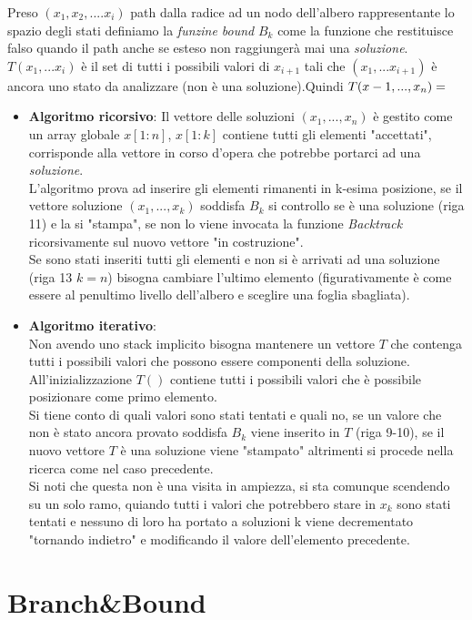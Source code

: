 \documentclass[a4paper]{article}
\begin{document}
Preso $(x_1,x_2,....x_i)$ path dalla radice ad un nodo dell'albero rappresentante lo spazio degli stati definiamo la \textit{funzine bound} $B_k$ come la funzione che restituisce falso quando il path anche se esteso non raggiungerà mai una \textit{soluzione}.\\
$T(x_1,...x_i)$ è il set di tutti i possibili valori di $x_{i+1}$ tali che $(x_1,...x_{i+1})$ è ancora uno stato da analizzare (non è una soluzione).Quindi $T(x-1,...,x_n) = \empty$
\begin{itemize}
	\item \textbf{Algoritmo ricorsivo}:
		Il vettore delle soluzioni $(x_1, ... , x_n)$ è gestito come un array globale $x[1:n]$, $x[1:k]$ contiene tutti gli elementi "accettati", corrisponde alla vettore in corso d'opera che potrebbe portarci ad una \textit{soluzione}.\\
		L'algoritmo prova ad inserire gli elementi rimanenti in k-esima posizione, se il vettore soluzione $(x_1,...,x_k)$ soddisfa $B_k$ si controllo se è una soluzione (riga 11) e la si "stampa", se non lo viene invocata la funzione \textit{Backtrack} ricorsivamente sul nuovo vettore "in costruzione".\\
		Se sono stati inseriti tutti gli elementi e non si è arrivati ad una soluzione (riga 13 $k=n$) bisogna cambiare l'ultimo elemento (figurativamente è come essere al penultimo livello dell'albero e sceglire una foglia sbagliata).
	\item \textbf{Algoritmo iterativo}:\\
		Non avendo uno stack implicito bisogna mantenere un vettore $T$ che contenga tutti i possibili valori che possono essere componenti della soluzione.
		All'inizializzazione $T()$ contiene tutti i possibili valori che è possibile posizionare come primo elemento.\\
		Si tiene conto di quali valori sono stati tentati e quali no, se un valore che non è stato ancora provato soddisfa $B_k$ viene inserito in $T$ (riga 9-10), se il nuovo vettore $T$ è una soluzione viene "stampato" altrimenti si procede nella ricerca come nel caso precedente.\\
		Si noti che questa non è una visita in ampiezza, si sta comunque scendendo su un solo ramo, quiando tutti i valori che potrebbero stare in $x_k$ sono stati tentati e nessuno di loro ha portato a soluzioni k viene decrementato "tornando indietro" e modificando il valore dell'elemento precedente.
\end{itemize}
\section{Branch\&Bound}
\end{document}
